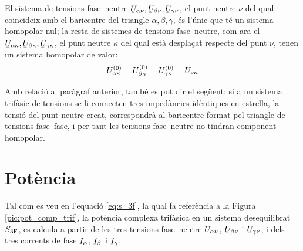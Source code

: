 El sistema de tensions fase--neutre
$\cmplx{U}_{\alpha\nu},\cmplx{U}_{\beta\nu},\cmplx{U}_{\gamma\nu}$,
el punt neutre $\nu$ del qual coincideix amb el baricentre del
triangle $\alpha, \beta,
 \gamma$, \'{e}s l'\'{u}nic que t\'{e} un sistema homopolar nul; la resta de sistemes de tensions
 fase--neutre, com ara el $\cmplx{U}_{\alpha\kappa},\cmplx{U}_{\beta\kappa},\cmplx{U}_{\gamma\kappa}$,
 el punt neutre $\kappa$ del qual est\`{a} despla\c{c}at respecte del punt $\nu$, tenen un sistema
 homopolar de valor:
\begin{equation}
    \cmplx{U}_{\alpha\kappa}\ap{(0)} = \cmplx{U}_{\beta\kappa}\ap{(0)} =
    \cmplx{U}_{\gamma\kappa}\ap{(0)} = \cmplx{U}_{\nu\kappa}
\end{equation}

Amb relaci\'{o} al par\`{a}graf anterior, tamb\'{e} es pot dir el seg\"{u}ent: si a
un sistema trif\`{a}sic de tensions se li connecten tres imped\`{a}ncies
id\`{e}ntiques en estrella, la tensi\'{o} del punt neutre creat,
correspondr\`{a} al baricentre format pel triangle de tensions
fase--fase, i per tant les tensions fase--neutre no tindran
component homopolar.

\section{Pot\`{e}ncia} 

Tal com es veu en l'equaci\'{o} \eqref{eq:s_3f}, la qual fa refer\`{e}ncia a
la Figura \vref{pic:pot_comp_trif}, la pot\`{e}ncia complexa trif\`{a}sica
en un sistema desequilibrat $\cmplx{S}\ped{3F}$, es calcula a partir
de les tres tensions fase--neutre $\cmplx{U}_{\alpha\nu}$,
$\cmplx{U}_{\beta\nu}$ i $\cmplx{U}_{\gamma\nu}$, i dels tres
corrents de fase $\cmplx{I}_\alpha$, $\cmplx{I}_\beta$ i
$\cmplx{I}_\gamma$.


